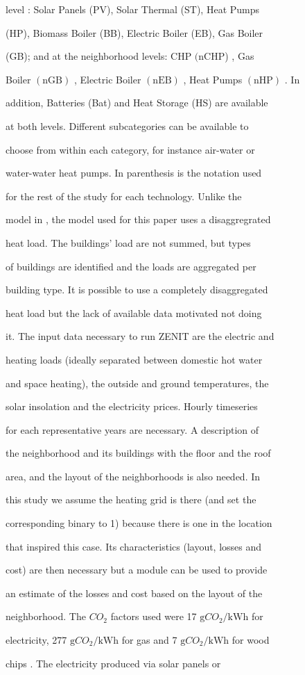 \documentclass[a4paper,12pt]{article}
\begin{document}
level : Solar Panels (PV), Solar Thermal (ST), Heat Pumps

(HP), Biomass Boiler (BB), Electric Boiler (EB), Gas Boiler

(GB); and at the neighborhood levels: CHP $($nCHP) , Gas

Boiler $(\mathrm{n}\mathrm{G}\mathrm{B})$ , Electric Boiler $(\mathrm{n}\mathrm{E}\mathrm{B})$ , Heat Pumps $(\mathrm{n}\mathrm{H}\mathrm{P})$ . In

addition, Batteries (Bat) and Heat Storage (HS) are available

at both levels. Different subcategories can be available to

choose from within each category, for instance air-water or

water-water heat pumps. In parenthesis is the notation used

for the rest of the study for each technology. Unlike the

model in , the model used for this paper uses a disaggregrated

heat load. The buildings’ load are not summed, but types

of buildings are identified and the loads are aggregated per

building type. It is possible to use a completely disaggregated

heat load but the lack of available data motivated not doing

it. The input data necessary to run ZENIT are the electric and

heating loads (ideally separated between domestic hot water

and space heating), the outside and ground temperatures, the

solar insolation and the electricity prices. Hourly timeseries

for each representative years are necessary. A description of

the neighborhood and its buildings with the floor and the roof

area, and the layout of the neighborhoods is also needed. In

this study we assume the heating grid is there (and set the

corresponding binary to 1) because there is one in the location

that inspired this case. Its characteristics (layout, losses and

cost) are then necessary but a module can be used to provide

an estimate of the losses and cost based on the layout of the

neighborhood. The $CO_{2}$ factors used were 17 $\mathrm{g}CO_{2}/\mathrm{k}\mathrm{W}\mathrm{h}$ for

electricity, 277 $\mathrm{g}CO_{2}/\mathrm{k}\mathrm{W}\mathrm{h}$ for gas and 7 $\mathrm{g}CO_{2}/\mathrm{k}\mathrm{W}\mathrm{h}$ for wood

chips . The electricity produced via solar panels or
\end{document}

